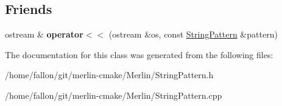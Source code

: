 \subsection*{Friends}
\begin{DoxyCompactItemize}
\item 
\mbox{\label{classStringPattern_a9af1563eb21f0eb9149a04dd3e20ac95}} 
ostream \& {\bfseries operator$<$$<$} (ostream \&os, const \hyperlink{classStringPattern}{String\+Pattern} \&pattern)
\end{DoxyCompactItemize}


The documentation for this class was generated from the following files\+:\begin{DoxyCompactItemize}
\item 
/home/fallon/git/merlin-\/cmake/\+Merlin/String\+Pattern.\+h\item 
/home/fallon/git/merlin-\/cmake/\+Merlin/String\+Pattern.\+cpp\end{DoxyCompactItemize}
